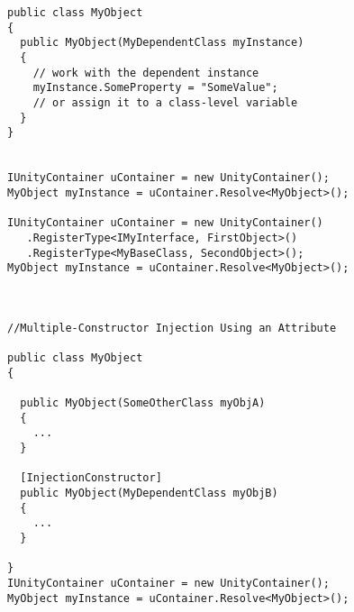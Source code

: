\documentclass[a4paper,10pt]{scrreprt}
\begin{document}
\begin{lstlisting}[caption=Constructor Injection]
public class MyObject
{
  public MyObject(MyDependentClass myInstance)
  { 
    // work with the dependent instance
    myInstance.SomeProperty = "SomeValue";
    // or assign it to a class-level variable
  }
} 


IUnityContainer uContainer = new UnityContainer();
MyObject myInstance = uContainer.Resolve<MyObject>();

IUnityContainer uContainer = new UnityContainer()
   .RegisterType<IMyInterface, FirstObject>()
   .RegisterType<MyBaseClass, SecondObject>();
MyObject myInstance = uContainer.Resolve<MyObject>();



//Multiple-Constructor Injection Using an Attribute

public class MyObject
{

  public MyObject(SomeOtherClass myObjA)
  { 
    ...
  }

  [InjectionConstructor]
  public MyObject(MyDependentClass myObjB)
  { 
    ...
  }

} 
IUnityContainer uContainer = new UnityContainer();
MyObject myInstance = uContainer.Resolve<MyObject>();

  



\end{lstlisting}
\end{document}
